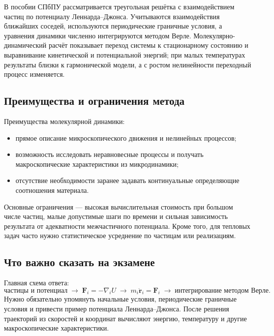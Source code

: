 В пособии СПбПУ рассматривается треугольная решётка с взаимодействием
частиц по потенциалу Леннарда--Джонса. Учитываются взаимодействия
ближайших соседей, используются периодические граничные условия, а уравнения
динамики численно интегрируются методом Верле. Молекулярно-динамический расчёт
показывает переход системы к стационарному состоянию и выравнивание
кинетической и потенциальной энергий; при малых температурах результаты близки
к гармонической модели, а с ростом нелинейности переходный процесс изменяется.

\subsection{Преимущества и ограничения метода}

Преимущества молекулярной динамики:
\begin{itemize}
    \item прямое описание микроскопического движения и нелинейных процессов;
    \item возможность исследовать неравновесные процессы и получать
    макроскопические характеристики из микродинамики;
    \item отсутствие необходимости заранее задавать континуальные
    определяющие соотношения материала.
\end{itemize}
Основные ограничения --- высокая вычислительная стоимость при большом числе
частиц, малые допустимые шаги по времени и сильная зависимость результата от
адекватности межчастичного потенциала. Кроме того, для тепловых задач часто
нужно статистическое усреднение по частицам или реализациям.

\subsection{Что важно сказать на экзамене}

Главная схема ответа:
\[
    \text{частицы и потенциал}
    \;\longrightarrow\;
    \mathbf F_i=-\nabla_i U
    \;\longrightarrow\;
    m_i\ddot{\mathbf r}_i=\mathbf F_i
    \;\longrightarrow\;
    \text{интегрирование методом Верле}.
\]
Нужно обязательно упомянуть начальные условия, периодические граничные условия
и привести пример потенциала Леннарда--Джонса. После решения траекторий из
скоростей и координат вычисляют энергию, температуру и другие макроскопические
характеристики.

\newpage
